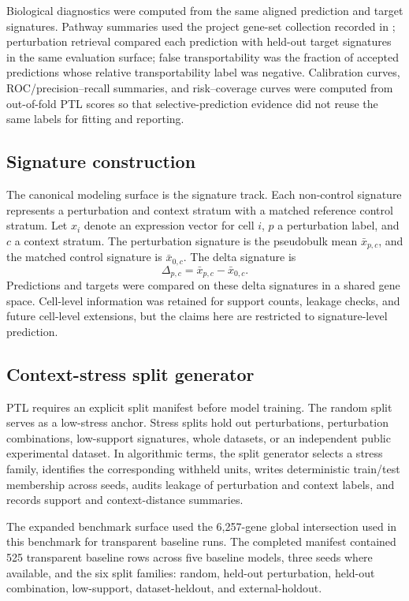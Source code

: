Biological diagnostics were computed from the same aligned prediction and target signatures. Pathway summaries used the project gene-set collection recorded in ; perturbation retrieval compared each prediction with held-out target signatures in the same evaluation surface; false transportability was the fraction of accepted predictions whose relative transportability label was negative. Calibration curves, ROC/precision--recall summaries, and risk--coverage curves were computed from out-of-fold PTL scores so that selective-prediction evidence did not reuse the same labels for fitting and reporting.

\subsection{Signature construction}

The canonical modeling surface is the signature track. Each non-control signature represents a perturbation and context stratum with a matched reference control stratum. Let \(x_{i}\) denote an expression vector for cell \(i\), \(p\) a perturbation label, and \(c\) a context stratum. The perturbation signature is the pseudobulk mean \(\bar{x}_{p,c}\), and the matched control signature is \(\bar{x}_{0,c}\). The delta signature is
\[
\Delta_{p,c}=\bar{x}_{p,c}-\bar{x}_{0,c}.
\]
Predictions and targets were compared on these delta signatures in a shared gene space. Cell-level information was retained for support counts, leakage checks, and future cell-level extensions, but the claims here are restricted to signature-level prediction.

\subsection{Context-stress split generator}

PTL requires an explicit split manifest before model training. The random split serves as a low-stress anchor. Stress splits hold out perturbations, perturbation combinations, low-support signatures, whole datasets, or an independent public experimental dataset. In algorithmic terms, the split generator selects a stress family, identifies the corresponding withheld units, writes deterministic train/test membership across seeds, audits leakage of perturbation and context labels, and records support and context-distance summaries.

The expanded benchmark surface used the 6,257-gene global intersection used in this benchmark for transparent baseline runs. The completed manifest contained 525 transparent baseline rows across five baseline models, three seeds where available, and the six split families: random, held-out perturbation, held-out combination, low-support, dataset-heldout, and external-holdout.

